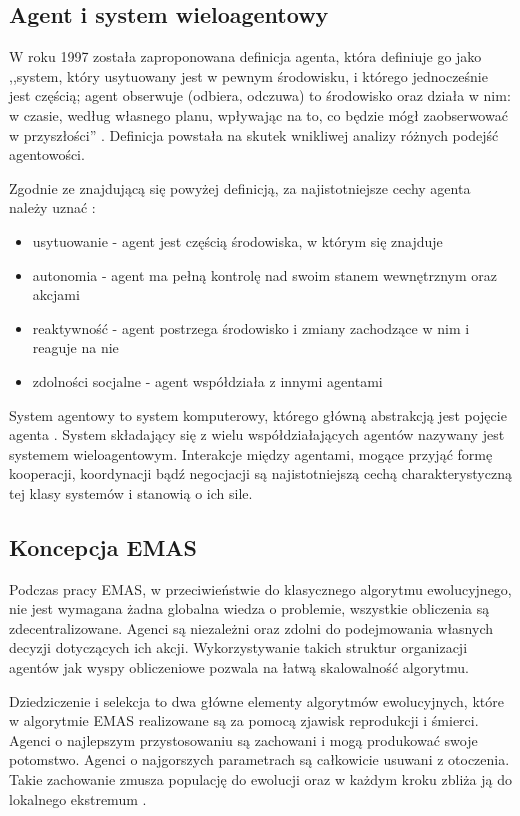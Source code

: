 \subsection*{Agent i system wieloagentowy}

W roku 1997 została zaproponowana definicja agenta, która definiuje go jako ,,system, który usytuowany jest w pewnym środowisku, i którego jednocześnie jest częścią; agent obserwuje (odbiera, odczuwa) to środowisko oraz działa w nim: w czasie, według własnego planu, wpływając na to, co będzie mógł zaobserwować w przyszłości'' \cite{opisagenta}. Definicja powstała na skutek wnikliwej analizy różnych podejść agentowości.

Zgodnie ze znajdującą się powyżej definicją, za najistotniejsze cechy agenta należy uznać \cite{agentowyemas}:
\begin{itemize}
\item usytuowanie - agent jest częścią środowiska, w którym się znajduje
\item autonomia - agent ma pełną kontrolę nad swoim stanem wewnętrznym oraz akcjami
\item reaktywność - agent postrzega środowisko i zmiany zachodzące w nim i reaguje na nie
\item zdolności socjalne - agent współdziała z innymi agentami
\end{itemize}

System agentowy to system komputerowy, którego główną abstrakcją jest pojęcie agenta \cite{systemagentowy}. System składający się z wielu współdziałających agentów nazywany jest systemem wieloagentowym. Interakcje między agentami, mogące przyjąć formę kooperacji, koordynacji bądź negocjacji są najistotniejszą cechą charakterystyczną tej klasy systemów i stanowią o ich sile. 



\subsection*{Koncepcja EMAS}
\label{sec:emas}

Podczas pracy EMAS, w przeciwieństwie do klasycznego algorytmu ewolucyjnego, nie jest wymagana żadna globalna wiedza o problemie, wszystkie obliczenia są zdecentralizowane. Agenci są niezależni oraz zdolni do podejmowania własnych decyzji dotyczących ich akcji. Wykorzystywanie takich struktur organizacji agentów jak wyspy obliczeniowe pozwala na łatwą skalowalność algorytmu. 

Dziedziczenie i selekcja to dwa główne elementy algorytmów ewolucyjnych, które w algorytmie EMAS realizowane są za pomocą zjawisk reprodukcji i śmierci. Agenci o najlepszym przystosowaniu są zachowani i mogą produkować swoje potomstwo. Agenci o najgorszych parametrach są całkowicie usuwani z otoczenia. Takie zachowanie zmusza populację do ewolucji oraz w każdym kroku zbliża ją do lokalnego ekstremum \cite{emas2}.

